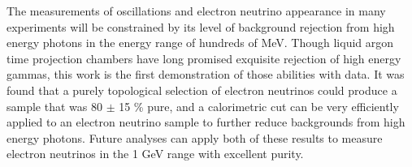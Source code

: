The measurements of oscillations and electron neutrino appearance in many experiments will be constrained by its level of background rejection from high energy photons in the energy range of hundreds of MeV.  Though liquid argon time projection chambers have long promised exquisite rejection of high energy gammas, this work is the first demonstration of those abilities with data.  It was found that a purely topological selection of electron neutrinos could produce a sample that was 80 $\pm$ 15 \% pure, and a calorimetric cut can be very efficiently applied to an electron neutrino sample to further reduce backgrounds from high energy photons.  Future analyses can apply both of these results to measure electron neutrinos in the 1 GeV range with excellent purity.